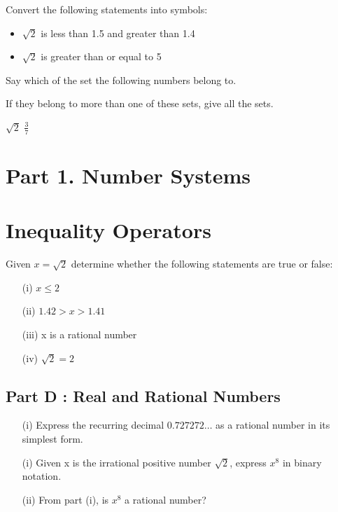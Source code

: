 Convert the following statements into symbols:


\begin{itemize}
\item $\sqrt{2}$ is less than 1.5 and greater than 1.4
\item $\sqrt{2}$ is greater than or equal to 5
\end{itemize}



Say which of the set the following numbers belong to.

If they belong to more than one of these sets, give all the sets.

$\sqrt{2}$
$\frac{3}{7}$
\section*{Part 1. Number Systems}


\section{Inequality Operators}


Given $x = \sqrt{2}$ determine whether the following statements are true or false:

\begin{itemize}
\item[(i)] $x \leq 2$
\item[(ii)] $1.42 > x > 1.41$
\item[(iii)] x is a rational number
\item[(iv)] $\sqrt{2} = 2$
\end{itemize}


\subsection*{Part D : Real and Rational Numbers}
\begin{itemize}
\item[(i)] Express the recurring decimal $0.727272\ldots$ as a rational number in its simplest form.
\end{itemize}
\begin{itemize}
\item[(i)] Given x is the irrational positive number $\sqrt{2}$, express $x^8$ in binary notation.
\item[(ii)] From part (i), is $x^8$ a rational number?
\end{itemize}







